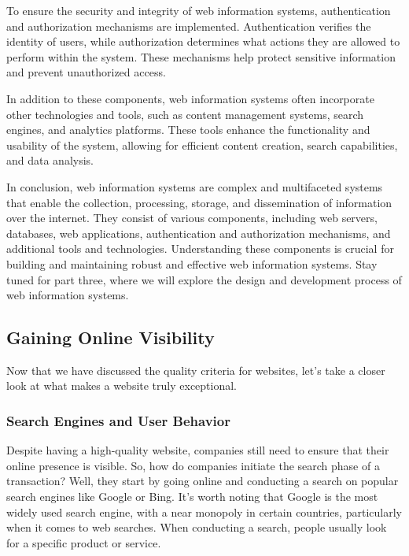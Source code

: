 To ensure the security and integrity of web information systems,
authentication and authorization mechanisms are implemented.
Authentication verifies the identity of users, while authorization
determines what actions they are allowed to perform within the system.
These mechanisms help protect sensitive information and prevent
unauthorized access.

In addition to these components, web information systems often
incorporate other technologies and tools, such as content management
systems, search engines, and analytics platforms. These tools enhance
the functionality and usability of the system, allowing for efficient
content creation, search capabilities, and data analysis.

In conclusion, web information systems are complex and multifaceted
systems that enable the collection, processing, storage, and
dissemination of information over the internet. They consist of various
components, including web servers, databases, web applications,
authentication and authorization mechanisms, and additional tools and
technologies. Understanding these components is crucial for building and
maintaining robust and effective web information systems. Stay tuned for
part three, where we will explore the design and development process of
web information systems.


\subsection{Gaining Online Visibility}\label{gaining-online-visibility}

Now that we have discussed the quality criteria for websites, let's take
a closer look at what makes a website truly exceptional.

\subsubsection{Search Engines and User
  Behavior}\label{search-engines-and-user-behavior}

Despite having a high-quality website, companies still need to ensure
that their online presence is visible. So, how do companies initiate the
search phase of a transaction? Well, they start by going online and
conducting a search on popular search engines like Google or Bing. It's
worth noting that Google is the most widely used search engine, with a
near monopoly in certain countries, particularly when it comes to web
searches. When conducting a search, people usually look for a specific
product or service.

